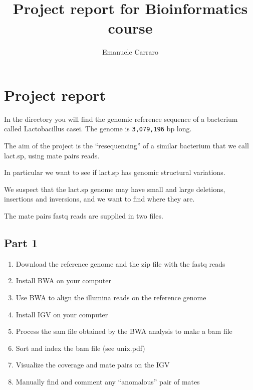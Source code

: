 \author{Emanuele Carraro}

\title{Project report for Bioinformatics course}
\maketitle

\newpage
\tableofcontents

\newpage
\section{Project report}

In the directory you will find the genomic reference sequence of a bacterium
called Lactobacillus casei. The genome is \texttt{3,079,196} bp long.

The aim of the project is the ``resequencing'' of a similar
bacterium that we call lact.sp, using mate pairs reads.

In particular we want to see if lact.sp has genomic structural variations.

We suspect that the lact.sp genome may have small and large deletions,
insertions and inversions, and we want to find where they are.

The mate pairs fastq reads are supplied in two files.
\subsection{Part 1}

\begin{enumerate}
\item Download the reference genome and the zip file with the fastq reads
\item Install BWA on your computer
\item Use BWA to align the illumina reads on the reference genome
\item Install IGV on your computer
\item Process the sam file obtained by the BWA analysis to make a bam file
\item Sort and index the bam file (see unix.pdf)
\item Visualize the coverage and mate pairs on the IGV
\item Manually find and comment any ``anomalous'' pair of mates
\end{enumerate}

